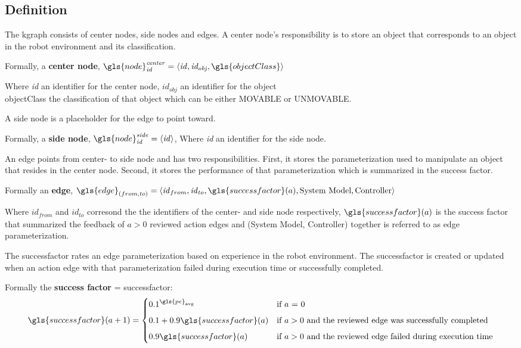 \subsection{Definition}%
\label{subsec:kgraph_definition}
The \ac{kgraph} consists of center nodes, side nodes and edges. A center node's responsibility is to store an object that corresponds to an object in the robot environment and its classification.\bs

Formally, a \textbf{center node}, $\gls{node}^{\mathit{center}}_\mathit{id} =\left\langle \mathit{id}, \mathit{id_{obj}}, \gls{objectClass} \right\rangle $\bs

Where \textit{id} an identifier for the center node, $\mathit{id_{obj}}$ an identifier for the object\\\gls{objectClass} the classification of that object which can be either MOVABLE or UNMOVABLE.\bs

\noindent A side node is a placeholder for the edge to point toward.\bs

Formally, a \textbf{side node}, $\gls{node}^{\mathit{side}}_\mathit{id} =\left\langle \mathit{id} \right\rangle $, Where \textit{id} an identifier for the side node.\bs

\noindent An edge points from center- to side node and has two responsibilities. First, it stores the parameterization used to manipulate an object that resides in the center node. Second, it stores the performance of that parameterization which is summarized in the success factor.\bs

Formally an \textbf{edge}, $\gls{edge}_{(from, to)} = \left\langle \mathit{id}_{from}, \mathit{id}_{to}, \gls{successfactor}(a), \textrm{System Model}, \textrm{Controller}\right\rangle$\bs

Where $\mathit{id}_\mathit{from}$ and $\mathit{id}_\mathit{to}$ corresond the the identifiers of the center- and side node respectively, $\gls{successfactor}(a)$ is the success factor that summarized the feedback of $a>0$ reviewed action edges and (System Model, Controller) together is referred to as edge parameterization. \bs

The successfactor rates an edge parameterization based on experience in the robot environment. The successfactor is created or updated when an action edge with that parameterization failed during execution time or successfully completed.\bs

Formally the \textbf{success factor} = \gls{successfactor}:
\[\gls{successfactor}(a+1) =
  \begin{cases} 0.1^{\gls{pe}_\textrm{avg}}& \textrm{if $a$ = 0}\\[5px]
    0.1 + 0.9\gls{successfactor}(a) & \textrm{if $a > 0$ and the reviewed edge was successfully completed}\\[5px]
  0.9\gls{successfactor}(a) & \textrm{if $a > 0$ and the reviewed edge failed during execution time}
\end{cases}\]

